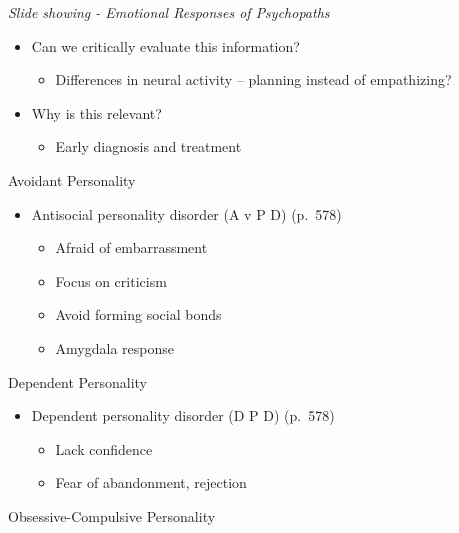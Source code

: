 \documentclass[
]{book}
\providecommand{\tightlist}{%
  \setlength{\itemsep}{0pt}\setlength{\parskip}{0pt}}
\begin{document}
\begin{reflect}
\emph{Slide showing - Emotional Responses of Psychopaths }

\begin{itemize}
\tightlist
\item
  Can we critically evaluate this information?

  \begin{itemize}
  \tightlist
  \item
    Differences in neural activity -- planning instead of empathizing?\\
  \end{itemize}
\item
  Why is this relevant?

  \begin{itemize}
  \tightlist
  \item
    Early diagnosis and treatment
  \end{itemize}
\end{itemize}

Avoidant Personality

\begin{itemize}
\tightlist
\item
  Antisocial personality disorder (A v P D) (p.~578)

  \begin{itemize}
  \tightlist
  \item
    Afraid of embarrassment\\
  \item
    Focus on criticism\\
  \item
    Avoid forming social bonds\\
  \item
    Amygdala response
  \end{itemize}
\end{itemize}

Dependent Personality

\begin{itemize}
\tightlist
\item
  Dependent personality disorder (D P D) (p.~578)

  \begin{itemize}
  \tightlist
  \item
    Lack confidence\\
  \item
    Fear of abandonment, rejection
  \end{itemize}
\end{itemize}

Obsessive-Compulsive Personality


\end{reflect}
\end{document}
